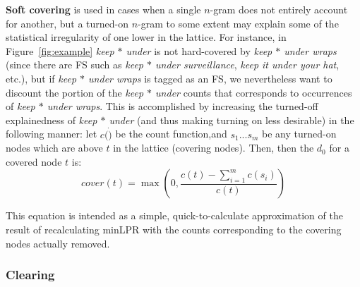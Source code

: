 \documentclass[11pt,letterpaper]{article}
\makeatletter
\def \etc {etc.\@ }
\newcommand{\dotts}{...}
\newcommand{\gap}{$*$\xspace}
\newcommand{\ex}[1]{\textit{#1}\xspace}
\newcommand{\termdef}[1]{\textbf{#1}\xspace}
\newcommand{\figref}[2][]{Figure#1~\ref{#2}\xspace}
\makeatother
\begin{document}
\termdef{Soft covering} is used in cases when a single $n$-gram does not entirely account for another, but a turned-on $n$-gram to some extent may explain some of the statistical irregularity of one lower in the lattice. For instance, in \figref{fig:example} \ex{keep \gap under} is not hard-covered by \ex{keep \gap under wraps} (since there are FS such as \ex{keep \gap under surveillance}, \ex{keep it under your hat}, \etc), but if \ex{keep \gap under wraps} is tagged as an FS, we nevertheless want to discount the portion of the \ex{keep \gap under} counts that corresponds to occurrences of \ex{keep \gap under wraps}. This is accomplished by increasing the turned-off explainedness of \ex{keep \gap under} (and thus making turning on less desirable) in the following manner: let $c(\dot)$ be the count function,and $s_1\dotts s_m$ be any turned-on nodes which are above $t$ in the lattice (covering nodes). Then, then the $d_0$ for a covered node $t$ is:
\begin{displaymath}
cover(t) = \max(0,\frac{c(t) - \sum_{i=1}^{m}{c(s_i)}}{c(t)})
\end{displaymath}

\noindent
This equation is intended as a simple, quick-to-calculate approximation of the result of recalculating minLPR with the counts corresponding to the covering nodes actually removed.

\subsubsection{Clearing}
\end{document}
